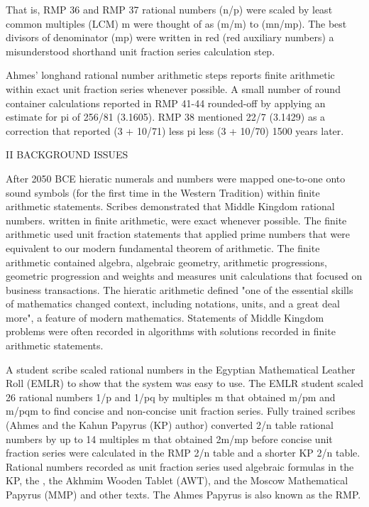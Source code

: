 \documentclass[12pt]{article}
\begin{document}
That is, RMP 36 and RMP 37 rational numbers (n/p) were scaled by least common multiples (LCM) m were thought of as (m/m) to (mn/mp). The best divisors of denominator (mp) were written in red (red auxiliary numbers) a misunderstood shorthand unit fraction series calculation step. 

Ahmes' longhand rational number arithmetic steps reports finite arithmetic within exact unit fraction series whenever possible. A small number of round container calculations reported in RMP 41-44 rounded-off by applying an estimate for pi of 256/81 (3.1605). RMP 38 mentioned 22/7 (3.1429) as a correction  that  reported (3 + 10/71) less pi less (3 + 10/70) 1500 years later.

II BACKGROUND ISSUES

After 2050 BCE hieratic numerals and numbers were mapped one-to-one onto sound symbols (for the first time in the Western Tradition) within finite arithmetic statements. Scribes demonstrated that Middle Kingdom rational numbers. written in finite arithmetic, were exact whenever possible. The finite arithmetic used unit fraction statements that applied prime numbers that were equivalent to our modern fundamental theorem of arithmetic. The finite arithmetic contained algebra, algebraic geometry, arithmetic progressions, geometric progression and weights and measures unit calculations that focused on business transactions. The hieratic arithmetic defined "one of the essential skills of mathematics changed context, including notations, units, and a great deal more", a feature of modern mathematics. Statements of Middle Kingdom problems were often recorded in algorithms with solutions recorded in finite arithmetic statements. 

A student scribe scaled rational numbers in the Egyptian Mathematical Leather Roll (EMLR) to show that the system was easy to use. The EMLR student  scaled 26 rational numbers 1/p and 1/pq by multiples m that obtained m/pm and m/pqm to find concise and non-concise unit fraction series. Fully trained scribes (Ahmes and the Kahun Papyrus (KP) author) converted 2/n table rational numbers by up to 14 multiples m that obtained 2m/mp before concise unit fraction series were calculated in the RMP 2/n table and a shorter KP 2/n table. Rational numbers recorded as unit fraction series used algebraic formulas in the KP, the , the Akhmim Wooden Tablet (AWT), and the Moscow Mathematical Papyrus (MMP) and other texts. The Ahmes Papyrus is also known as the RMP.
\end{document}
